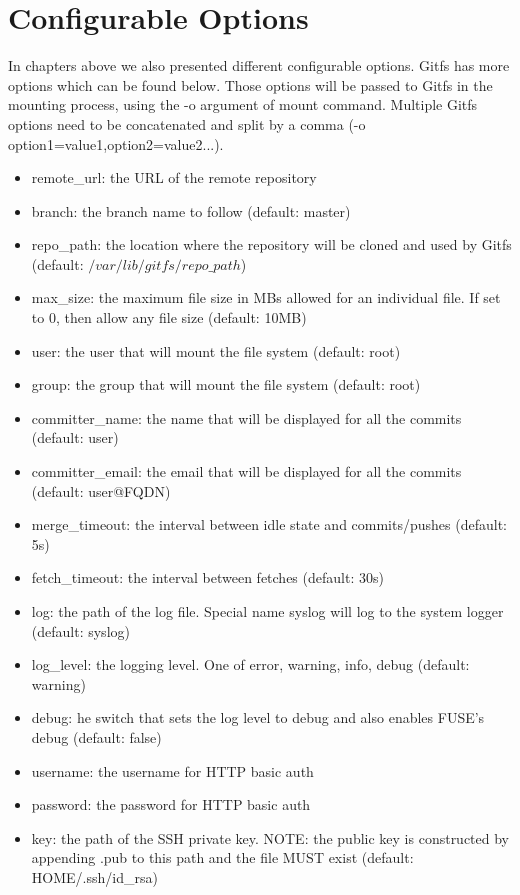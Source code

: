 \section{Configurable Options}
In chapters above we also presented different configurable options. Gitfs has more options which can be found below. Those options will be passed to Gitfs in the mounting process, using the -o argument of mount command. Multiple Gitfs options need to be concatenated and split by a comma (-o option1=value1,option2=value2...).

\begin{itemize}
    \item remote\_url: the URL of the remote repository
    \item branch: the branch name to follow (default: master)
    \item repo\_path: the location where the repository will be cloned and used by Gitfs
    (default: $/var/lib/gitfs/repo\_path$)
    \item max\_size: the maximum file size in MBs allowed for an individual file. If set to 0, then allow any file size (default: 10MB)
    \item user: the user that will mount the file system (default: root)
    \item group: the group that will mount the file system (default: root)
    \item committer\_name: the name that will be displayed for all the commits (default: user)
    \item committer\_email: the email that will be displayed for all the commits (default: user@FQDN)
    \item merge\_timeout: the interval between idle state and commits/pushes (default: 5s)
    \item fetch\_timeout: the interval between fetches (default: 30s)
    \item log: the path of the log file. Special name syslog will log to the system logger (default: syslog)
    \item log\_level: the logging level. One of error, warning, info, debug (default: warning)
    \item debug: he switch that sets the log level to debug and also enables FUSE’s debug (default: false)
    \item username: the username for HTTP basic auth 
    \item password: the password for HTTP basic auth
    \item key: the path of the SSH private key. NOTE: the public key is constructed by appending .pub to this path and the file MUST exist (default: \textdollar HOME/.ssh/id\_rsa)
\end{itemize}